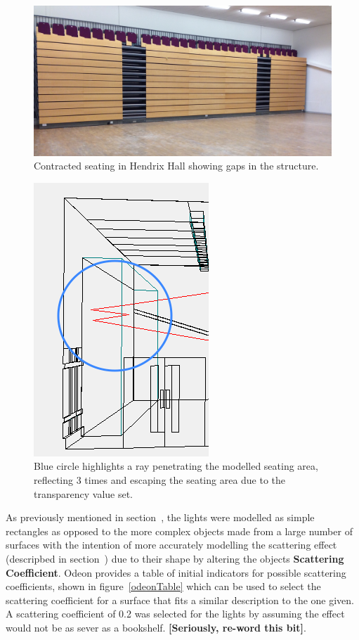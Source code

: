 \documentclass[../../main.tex]{subfiles}
\begin{document}
			\begin{figure}[H]
				\center\includegraphics[scale = 0.12]{Sections/Implementation/Odeon/images/seating.jpg}
				\caption{Contracted seating in Hendrix Hall showing gaps in the structure.}
				\label{seating}
			\end{figure}

			\begin{figure}[H]
				\center\includegraphics[scale = 0.7]{Sections/Implementation/Odeon/images/OdeonRays/transparencyEdit/singleRay2_edit3.PNG}
				\caption{Blue circle highlights a ray penetrating the modelled seating area, reflecting 3 times and escaping the seating area due to the transparency value set.}
				\label{transparency}
			\end{figure}

			As previously mentioned in section~, the lights were modelled as simple rectangles as opposed to the more complex objects made from a large number of surfaces with the intention of more accurately modelling the scattering effect (descripbed in section~) due to their shape by altering the objects \textbf{Scattering Coefficient}. Odeon provides a table of initial indicators for possible scattering coefficients, shown in figure~\ref{odeonTable} which can be used to select the scattering coefficient for a surface that fits a similar description to the one given. A scattering coefficient of 0.2 was selected for the lights by assuming the effect would not be as sever as a bookshelf. \textbf{[Seriously, re-word this bit]}.
\end{document}
